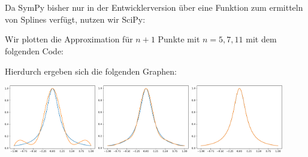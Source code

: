 \section{}

Da SymPy bisher nur in der Entwicklerversion über eine Funktion zum ermitteln von Splines verfügt, nutzen wir SciPy:



Wir plotten die Approximation für $n+1$ Punkte mit $n = 5, 7, 11$ mit dem folgenden Code:



Hierdurch ergeben sich die folgenden Graphen:

\begin{center}
  \includegraphics[width = 0.3\textwidth]{chapter_09/exercise_09_51_figure_1.pdf}
  \hspace{1em}
  \includegraphics[width = 0.3\textwidth]{chapter_09/exercise_09_51_figure_2.pdf}
  \hspace{1em}
  \includegraphics[width = 0.3\textwidth]{chapter_09/exercise_09_51_figure_3.pdf}
\end{center}
